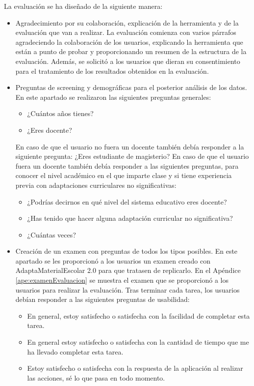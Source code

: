 La evaluación se ha diseñado de la siguiente manera:
\begin{itemize}
    \item Agradecimiento por su colaboración, explicación de la herramienta y de la evaluación que van a realizar. La evaluación comienza con varios párrafos agradeciendo la colaboración de los usuarios, explicando la herramienta que están a punto de probar y proporcionando un resumen de la estructura de la evaluación. Además, se solicitó a los usuarios que dieran su consentimiento para el tratamiento de los resultados obtenidos en la evaluación.
    \item Preguntas de screening y demográficas para el posterior análisis de los datos. En este apartado se realizaron las siguientes preguntas generales:
          \begin{itemize}
              \item ¿Cuántos años tienes?
              \item ¿Eres docente?
          \end{itemize}
          En caso de que el usuario no fuera un docente también debía responder a la siguiente pregunta: ¿Eres estudiante de magisterio? En caso de que el usuario fuera un docente también debía responder a las siguientes preguntas, para conocer el nivel académico en el que imparte clase y si tiene experiencia previa con adaptaciones curriculares no significativas:
          \begin{itemize}
              \item ¿Podrías decirnos en qué nivel del sistema educativo eres docente?
              \item ¿Has tenido que hacer alguna adaptación curricular no significativa?
              \item ¿Cuántas veces?
          \end{itemize}
    \item Creación de un examen con preguntas de todos los tipos posibles. En este apartado se les proporcionó a los usuarios un examen creado con AdaptaMaterialEscolar 2.0 para que tratasen de replicarlo. En el Apéndice \ref{ape:examenEvaluacion} se muestra el examen que se proporcionó a los usuarios para realizar la evaluación. Tras terminar cada tarea, los usuarios debían responder a las siguientes preguntas de usabilidad:
          \begin{itemize}
              \item En general, estoy  satisfecho o satisfecha con la facilidad de completar esta tarea.
              \item En general estoy  satisfecho o satisfecha con la cantidad de tiempo que me ha llevado completar esta tarea.
              \item Estoy  satisfecho o satisfecha con la respuesta de la aplicación al realizar las acciones, sé lo que pasa en todo momento.
          \end{itemize}


\end{itemize}
